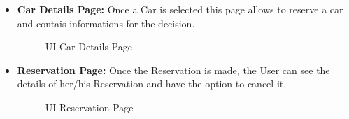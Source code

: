 \documentclass[a4paper]{article}
\begin{document}
\begin {itemize}
\begin{figure}[h]
\caption {UI Main Page}
\vspace*{0.2cm}
\end{figure}
\item \textbf{Car Details Page:} Once a Car is selected this page allows to reserve a car and contais informations for the decision.
\begin{figure}[h!]
\centering
\vspace*{\fill}
\noindent{}%
\caption {UI Car Details Page}
\vspace*{0.2cm}
\end{figure}
\pagebreak
\item \textbf{Reservation Page:} Once the Reservation is made, the User can see the details of her/his Reservation and have the option to cancel it.
\begin{figure}[h!]
\centering
\vspace*{\fill}
\noindent{}%
\caption {UI Reservation Page}
\vspace*{0.2cm}
\end{figure}

\end{itemize}
\end{document}
